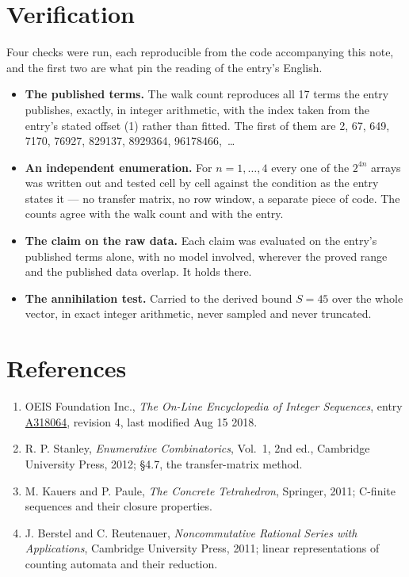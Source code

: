 \documentclass[11pt]{article}
\theoremstyle{definition}
\begin{document}
\section{Verification}

Four checks were run, each reproducible from the code accompanying this note, and the first two are what pin the reading of the entry's English.

\begin{itemize}

\item {\bfseries The published terms.} The walk count reproduces all 17 terms the entry publishes, exactly, in integer arithmetic, with the index taken from the entry's stated offset (1) rather than fitted. The first of them are 2, 67, 649, 7170, 76927, 829137, 8929364, 96178466,~\dots

\item {\bfseries An independent enumeration.} For $n = 1,\dots,4$ every one of the $2^{4n}$ arrays was written out and tested cell by cell against the condition as the entry states it --- no transfer matrix, no row window, a separate piece of code. The counts agree with the walk count and with the entry.

\item {\bfseries The claim on the raw data.} Each claim was evaluated on the entry's published terms alone, with no model involved, wherever the proved range and the published data overlap. It holds there.

\item {\bfseries The annihilation test.} Carried to the derived bound $S = 45$ over the whole vector, in exact integer arithmetic, never sampled and never truncated.

\end{itemize}

\section{References}

\begin{enumerate}

\item OEIS Foundation Inc., \emph{The On-Line Encyclopedia of Integer Sequences}, entry \href{https://oeis.org/A318064}{A318064}, revision 4, last modified Aug 15 2018.

\item R. P. Stanley, \emph{Enumerative Combinatorics}, Vol.~1, 2nd ed., Cambridge University Press, 2012; \S4.7, the transfer-matrix method.

\item M. Kauers and P. Paule, \emph{The Concrete Tetrahedron}, Springer, 2011; C-finite sequences and their closure properties.

\item J. Berstel and C. Reutenauer, \emph{Noncommutative Rational Series with Applications}, Cambridge University Press, 2011; linear representations of counting automata and their reduction.

\end{enumerate}
\end{document}
